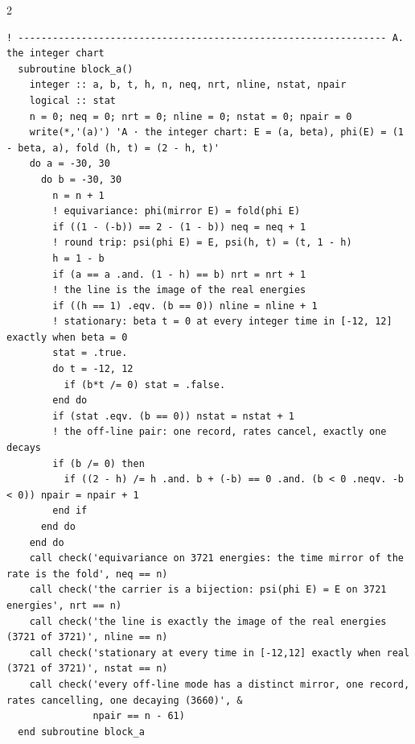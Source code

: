 \documentclass[10pt]{article}
\begin{document}
\begin{multicols}{2}
\begin{Verbatim}[fontsize=\fontsize{6.2}{7.2}\selectfont,breaklines,breakanywhere,breaksymbolleft={}]
  ! ---------------------------------------------------------------- A. the integer chart
  subroutine block_a()
    integer :: a, b, t, h, n, neq, nrt, nline, nstat, npair
    logical :: stat
    n = 0; neq = 0; nrt = 0; nline = 0; nstat = 0; npair = 0
    write(*,'(a)') 'A · the integer chart: E = (a, beta), phi(E) = (1 - beta, a), fold (h, t) = (2 - h, t)'
    do a = -30, 30
      do b = -30, 30
        n = n + 1
        ! equivariance: phi(mirror E) = fold(phi E)
        if ((1 - (-b)) == 2 - (1 - b)) neq = neq + 1
        ! round trip: psi(phi E) = E, psi(h, t) = (t, 1 - h)
        h = 1 - b
        if (a == a .and. (1 - h) == b) nrt = nrt + 1
        ! the line is the image of the real energies
        if ((h == 1) .eqv. (b == 0)) nline = nline + 1
        ! stationary: beta t = 0 at every integer time in [-12, 12] exactly when beta = 0
        stat = .true.
        do t = -12, 12
          if (b*t /= 0) stat = .false.
        end do
        if (stat .eqv. (b == 0)) nstat = nstat + 1
        ! the off-line pair: one record, rates cancel, exactly one decays
        if (b /= 0) then
          if ((2 - h) /= h .and. b + (-b) == 0 .and. (b < 0 .neqv. -b < 0)) npair = npair + 1
        end if
      end do
    end do
    call check('equivariance on 3721 energies: the time mirror of the rate is the fold', neq == n)
    call check('the carrier is a bijection: psi(phi E) = E on 3721 energies', nrt == n)
    call check('the line is exactly the image of the real energies (3721 of 3721)', nline == n)
    call check('stationary at every time in [-12,12] exactly when real (3721 of 3721)', nstat == n)
    call check('every off-line mode has a distinct mirror, one record, rates cancelling, one decaying (3660)', &
               npair == n - 61)
  end subroutine block_a


\end{Verbatim}
\end{multicols}
\end{document}
